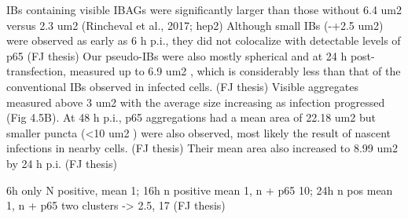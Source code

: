 \begin{figure}
    \label{fig:Distribution_IB_Areas_coInfected_Transfected_Cells_IFIT_RSV}
\end{figure}


IBs containing visible IBAGs were significantly larger than those without 6.4 um2 versus 2.3 um2 (Rincheval et al., 2017; hep2)
Although small IBs (-+2.5 um2) were observed as early as 6 h p.i., they did not colocalize with detectable levels of p65 (FJ thesis)
Our pseudo-IBs were also mostly spherical and at 24 h post-transfection, measured up to 6.9 um2 , which is considerably less than that of the conventional IBs observed in infected cells. (FJ thesis)
Visible aggregates measured above 3 um2 with the average size increasing as infection progressed (Fig 4.5B). At 48 h p.i., p65 aggregations had a mean area of 22.18 um2 but smaller puncta (<10 um2 ) were also observed, most likely the result of nascent infections in nearby cells. (FJ thesis)
Their mean area also increased to 8.99 um2 by 24 h p.i. (FJ thesis)

6h only N positive, mean 1; 16h n positive mean 1, n + p65 10; 24h n pos mean 1, n + p65 two clusters -> 2.5, 17 (FJ thesis)



